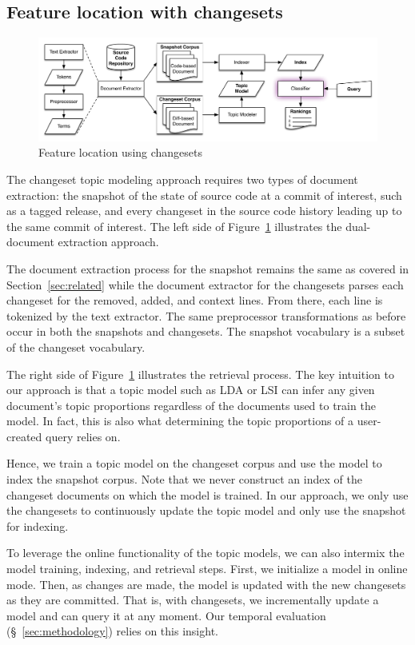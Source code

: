 \subsection{Feature location with changesets}

\begin{figure}
\centerline{\includegraphics[width=.9\textwidth]{figures/changeset-flt}}
\caption{Feature location using changesets}
\label{fig:changeset}
\end{figure}

The changeset topic modeling approach requires two types of document extraction:
the snapshot of the state of source code at a commit of interest, such as
a tagged release, and every changeset in the source code history leading up to
the same commit of interest.  The left side of Figure~\ref{fig:changeset}
illustrates the dual-document extraction approach.

The document extraction process for the snapshot remains the same as covered in
Section~\ref{sec:related} while the document extractor for the changesets parses
each changeset for the removed, added, and context lines.  From there, each line
is tokenized by the text extractor.  The same preprocessor transformations as
before occur in both the snapshots and changesets.  The snapshot vocabulary is
a subset of the changeset vocabulary.

The right side of Figure~\ref{fig:changeset} illustrates the retrieval process.
The key intuition to our approach is that a topic model such as LDA or LSI can
infer any given document's topic proportions regardless of the documents used to
train the model.  In fact, this is also what determining the topic proportions
of a user-created query relies on.

Hence, we train a topic model on the changeset corpus and use the model to index
the snapshot corpus.  Note that we never construct an index of the changeset
documents on which the model is trained.  In our approach, we only use the
changesets to continuously update the topic model and only use the snapshot for
indexing.

To leverage the online functionality of the topic models, we can also intermix
the model training, indexing, and retrieval steps.  First, we initialize a model
in online mode.  Then, as changes are made, the model is updated with the new
changesets as they are committed.  That is, with changesets, we incrementally
update a model and can query it at any moment.  Our temporal evaluation
(\S~\ref{sec:methodology}) relies on this insight.

